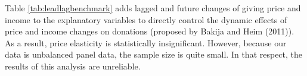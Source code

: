 \documentclass[
  11pt,
  a4paper,
]{article}
\begin{document}
Table \ref{tab:leadlagbenchmark} adds
lagged and future changes of giving price and income
to the explanatory variables
to directly control the dynamic effects of
price and income changes on donations (proposed by Bakija and Heim (2011)).
As a result, price elasticity is statistically insignificant.
However, because our data is unbalanced panel data,
the sample size is quite small.
In that respect, the results of this analysis are unreliable.

\clearpage
\end{document}
